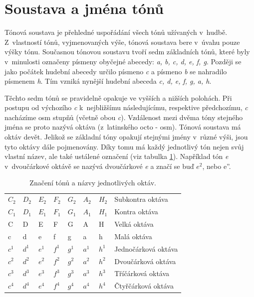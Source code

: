 \section{Soustava a jména tónů}
Tónová soustava je přehledné uspořádání všech tónů užívaných v~hudbě.
Z~vlastností tónů, vyjmenovaných výše, tónová soustava bere v~úvahu pouze výšky tónu. 
Současnou tónovou soustavu tvoří sedm základních tónů, které
byly v~minulosti označeny písmeny obyčejné abecedy: \emph{a, b, c, d, e, f, g}.
Později se jako počátek hudební abecedy určilo písmeno \emph{c} 
a písmeno \emph{b} se nahradilo písmenem \emph{h}.
Tím vzniká nynější hudební abeceda \emph{c, d, e, f, g, a, h}.
\par

Těchto sedm tónů se pravidelně opakuje ve vyšších a nižších polohách.
Při postupu od výchozího \emph{c} k~nejbližšímu následujícímu, respektive předchozímu, \emph{c} nacházíme osm stupňů 
(včetně obou \emph{c}).
Vzdálenost mezi dvěma tóny stejného jména se proto nazývá oktáva (z~latinského octo - osm).
Tónová soustava má oktáv devět.
Jelikož se základní tóny opakují stejnými jmény v~různé výši,
jsou tyto oktávy dále pojmenovány.
Díky tomu má každý jednotlivý tón nejen svůj vlastní název,
ale také ustálené označení (viz tabulka \ref{tabulkaOktav}).
Například tón \emph{e} v~dvoučárkové oktávě se nazývá dvoučárkové \emph{e}
a značí se buď $e^2$, nebo{ e''}.
\cite{zenkl,cmiral}
\par

\begin{table}[]
    \begin{tabular}{ l l l l l l l | l }
        $C_2$ & $D_2$ & $E_2$ & $F_2$ & $G_2$ & $A_2$ & $H_2$ & Subkontra oktáva    \\
        $C_1$ & $D_1$ & $E_1$ & $F_1$ & $G_1$ & $A_1$ & $H_1$ & Kontra oktáva       \\
        C     & D     & E     & F     & G     & A~& H     & Velká oktáva        \\
        c     & d     & e     & f     & g     & a     & h     & Malá oktáva         \\
        $c^1$ & $d^1$ & $e^1$ & $f^1$ & $g^1$ & $a^1$ & $h^1$ & Jednočárková oktáva \\
        $c^2$ & $d^2$ & $e^2$ & $f^2$ & $g^2$ & $a^2$ & $h^2$ & Dvoučárková oktáva  \\
        $c^3$ & $d^3$ & $e^3$ & $f^3$ & $g^3$ & $a^3$ & $h^3$ & Tříčárková oktáva   \\
        $c^4$ & $d^4$ & $e^4$ & $f^4$ & $g^4$ & $a^4$ & $h^4$ & Čtyřčárková oktáva  \\
    \end{tabular}
    \caption{Značení tónů a názvy jednotlivých oktáv.}
    \label{tabulkaOktav}
\end{table}

